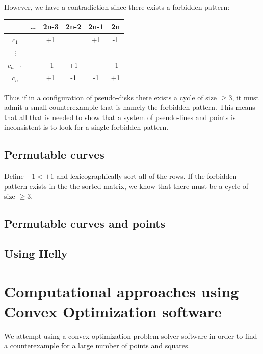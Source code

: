 \documentclass{NSF}
\begin{document}
However, we have a contradiction since there exists a forbidden pattern:

\begin{center}
\begin{tabular}{c|c c c c c}
                      & \dots & 2n-3 & 2n-2 & 2n-1 & 2n \\ \hline
$c_1$              &            & +1       &          &  +1    & -1    \\
$\vdots$          &            &         &          &          &    \\
$c_{n-1}$   &            &  -1    & \cellcolor[HTML]{CB0000} +1    &          &  \cellcolor[HTML]{CB0000} -1 \\
$c_{n}$      &             &  +1   &  \cellcolor[HTML]{CB0000} -1  &  -1    & \cellcolor[HTML]{CB0000} +1 \\
\end{tabular}
\end{center}

Thus if in a configuration of pseudo-disks there exists a cycle of size $\geq 3$, it must admit a small counterexample that is namely the forbidden pattern. This means that all that is needed to show that a system of pseudo-lines and points is inconsistent is to look for a single forbidden pattern.

\subsection{Permutable curves}

Define $-1 < +1$ and lexicographically sort all of the rows. If the forbidden pattern exists in the the sorted matrix, we know that there must be a cycle of size $\geq 3$.

\subsection{Permutable curves and points}

\subsection{Using Helly}

\section{Computational approaches using Convex Optimization software}
We attempt using a convex optimization problem solver software in order to find a counterexample for a large number of points and squares. 
\end{document}
